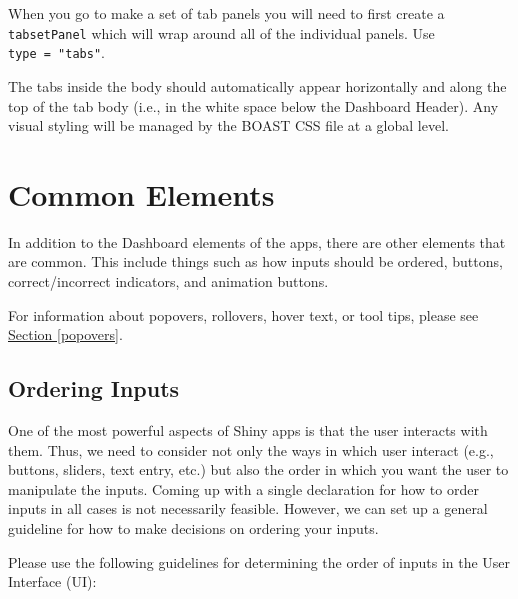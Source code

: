 \documentclass[
]{book}
\begin{document}
When you go to make a set of tab panels you will need to first create a \texttt{tabsetPanel} which will wrap around all of the individual panels. Use \texttt{type\ =\ "tabs"}.

The tabs inside the body should automatically appear horizontally and along the top of the tab body (i.e., in the white space below the Dashboard Header). Any visual styling will be managed by the BOAST CSS file at a global level.

\hypertarget{common-elements}{%
\section{Common Elements}\label{common-elements}}

In addition to the Dashboard elements of the apps, there are other elements that are common. This include things such as how inputs should be ordered, buttons, correct/incorrect indicators, and animation buttons.

For information about popovers, rollovers, hover text, or tool tips, please see \protect\hyperlink{popovers}{Section \ref{popovers}}.

\hypertarget{ordering-inputs}{%
\subsection{Ordering Inputs}\label{ordering-inputs}}

One of the most powerful aspects of Shiny apps is that the user interacts with them. Thus, we need to consider not only the ways in which user interact (e.g., buttons, sliders, text entry, etc.) but also the order in which you want the user to manipulate the inputs. Coming up with a single declaration for how to order inputs in all cases is not necessarily feasible. However, we can set up a general guideline for how to make decisions on ordering your inputs.

Please use the following guidelines for determining the order of inputs in the User Interface (UI):
\end{document}
